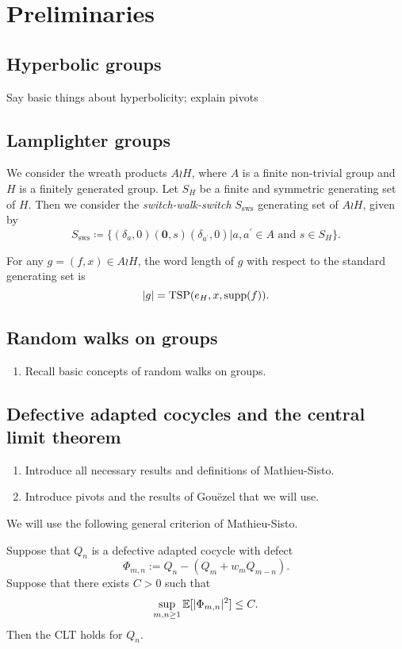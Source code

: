 \section{Preliminaries}

\subsection{Hyperbolic groups}
Say basic things about hyperbolicity; explain pivots

\subsection{Lamplighter groups}
We consider the wreath products $A\wr H$, where $A$ is a finite non-trivial group and $H$ is a finitely generated group. Let $S_H$ be a finite and symmetric generating set of $H$. Then we consider the \emph{switch-walk-switch} $S_{\mathrm{sws}}$ generating set of $A\wr H$, given by
\[
S_{\mathrm{sws}}\coloneqq \Big\{ (\delta_a,0)(\mathbf{0},s)(\delta_{a^{\prime}},0)\Big| a,a^{\prime}\in A\text{ and }s\in S_H \Big\}.
\]

\begin{thm}
For any $g=(f,x)\in A\wr H$, the word length of $g$ with respect to the standard generating set is
	\[
	|g|=\mathrm{TSP}(e_H,x,\mathrm{supp}(f)).
	\]
\end{thm}


\subsection{Random walks on groups}
\begin{enumerate}
	\item Recall basic concepts of random walks on groups.
\end{enumerate}
\subsection{Defective adapted cocycles and the central limit theorem}

\begin{enumerate}
	\item Introduce all necessary results and definitions of Mathieu-Sisto.
	\item Introduce pivots and the results of Gouëzel that we will use.
\end{enumerate}


We will use the following general criterion of Mathieu-Sisto.

\begin{defin}

\end{defin}

\begin{thm} \label{thm: MS general CLT with constant deviation ineq}
	Suppose that $Q_n$ is a defective adapted cocycle with defect
	\[
	\Phi_{m,n} := Q_n - (Q_m + w_m Q_{m-n}).
	\]
	Suppose that there exists $C>0$ such that  \[
	\sup_{m,n\ge 1}\mathbb{E}[|\Phi_{m,n}|^2] \le C.
	\]
	 Then the CLT holds for $Q_n$.
\end{thm}
